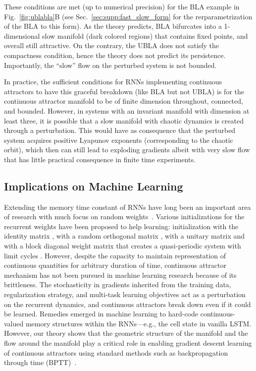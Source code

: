 \documentclass{article} %
\newcounter{ct}
\theoremstyle{definition}
\theoremstyle{remark}
\renewcommand{\cite}{\citep}
\begin{document}
These conditions are met (up to numerical precision) for the BLA example in Fig.~\ref{fig:ublabla}B (see Sec.~\ref{sec:supp:fast_slow_form} for the rerparametrization of the BLA to this form).
As the theory predicts, BLA bifurcates into a 1-dimensional slow manifold (dark colored regions) that contains fixed points, and overall still attractive.
On the contrary, the UBLA does not satisfy the compactness condition, hence the theory does not predict its persistence.
Importantly, the ``slow'' flow on the perturbed system is not bounded.


In practice, the sufficient conditions for RNNs implementing continuous attractors to have this graceful breakdown (like BLA but not UBLA) is for the continuous attractor manifold to be of finite dimension throughout, connected, and bounded.
However, in systems with an invariant manifold with dimension at least three, it is possible that a slow manifold with chaotic dynamics is created through a perturbation. This would have as consequence that the perturbed system acquires positive Lyapunov exponents (corresponding to the chaotic orbit), which then can still lead to exploding gradients albeit with very slow flow that has little practical consequence in finite time experiments.

\subsection{Implications on Machine Learning}\label{sec:imp:ML}
Extending the memory time constant of RNNs have long been an important area of research with much focus on random weights~\cite{Legenstein2007,Goldman2009,Toyoizumi2011,Kerg2019,Chen2018,Henaff2016,Rusch2021,arjovsky2016}.
Various initializations for the recurrent weights have been proposed to help learning: initialization with the identity matrix \citep{le2015}, with a random orthogonal matrix \citep{saxe2014,Henaff2016}, with a unitary matrix \citep{arjovsky2016} and with a block diagonal weight matrix that creates a quasi-periodic system with limit cycles \citep{Sokol2019a}.
However, despite the capacity to maintain representation of continuous quantities for arbitrary duration of time, continuous attractor mechanism has not been pursued in machine learning research because of its brittleness.
The stochasticity in gradients inherited from the training data, regularization strategy, and multi-task learning objectives act as a perturbation on the recurrent dynamics, and continuous attractors break down even if it could be learned.
Remedies emerged in machine learning to hard-code continuous-valued memory structures within the RNNs---e.g., the cell state in vanilla LSTM.
However, our theory shows that the geometric structure of the manifold and the flow around the manifold play a critical role in enabling gradient descent learning of continuous attractors using standard methods such as backpropagation through time (BPTT)~\cite{Toomarian1991}.
\end{document}
